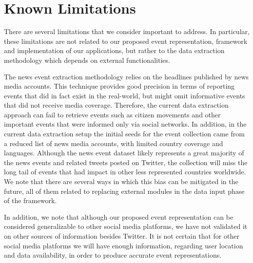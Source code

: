 \section{Known Limitations}\label{sec:limitations}
There are several limitations that we consider important to address. 
%
In particular, these limitations are not related to our proposed event
representation, framework and implementation of our applications, but rather to
the data extraction methodology which depends on external functionalities.

The news event extraction methodology relies on the headlines published by news
media accounts. 
%
This technique provides good precision in terms of reporting events that did in
fact exist in the real-world, but might omit informative events that did not
receive media coverage.
%
Therefore, the current data extraction approach can fail to retrieve events such
as citizen movements and other important events that were informed only via
social networks.  
%
In addition, in the current data extraction setup the initial seeds for the
event collection came from a reduced list of news media accounts, with limited
country coverage and languages.
%
Although the news event dataset likely represents a great majority of the news
events and related tweets posted on Twitter, the collection will miss the long
tail of events that had impact in other less represented countries worldwide. 
%
We note that there are several ways in which this bias can be mitigated in the
future, all of them related to replacing external modules in the data input
phase of the framework.

In addition, we note that although our proposed event representation can be
considered generalizable to other social media platforms, we have not validated
it on other sources of information besides Twitter. 
%
It is not certain that for other social media platforms we will have enough
information, regarding user location and data availability, in order to produce
accurate event representations.

